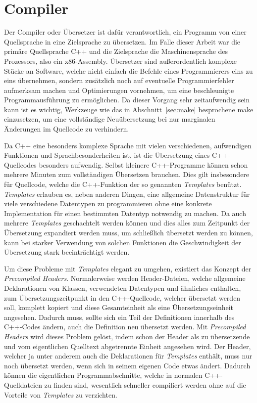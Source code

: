 \section{Compiler}
\label{sec:compiler}
Der Compiler oder Übersetzer ist dafür verantwortlich, ein Programm von einer Quellsprache in eine Zielsprache zu übersetzen. Im Falle dieser Arbeit war die primäre Quellsprache C++ und die
Zielsprache die Maschinensprache des Prozessors, also ein x86-Assembly. Übersetzer sind außerordentlich komplexe Stücke an Software, welche nicht einfach die Befehle eines Programmierers eins zu
eins übernehmen, sondern zusätzlich noch auf eventuelle Programmierfehler aufmerksam machen und Optimierungen vornehmen, um eine beschleunigte Programmausführung zu ermöglichen. Da dieser Vorgang sehr zeitaufwendig sein kann ist es wichtig, Werkzeuge wie
das in Abschnitt~\ref{sec:make} besprochene make einzusetzen, um eine vollständige Neuübersetzung bei nur marginalen Änderungen im Quellcode zu verhindern. 

Da C++ eine besonders komplexe Sprache mit vielen verschiedenen, aufwendigen Funktionen und Sprachbesonderheiten ist, ist die Übersetzung eines C++-Quellcodes besonders aufwendig. Selbst kleinere
C++-Programme können schon mehrere Minuten zum vollständigen Übersetzen brauchen. Dies gilt insbesondere für Quellcode, welche die C++-Funktion der so genannten \textit{Templates} benützt. \textit{Templates}
erlauben es, neben anderen Dingen, eine allgemeine Datenstruktur für viele verschiedene Datentypen zu programmieren ohne eine konkrete Implementation für einen bestimmten Datentyp notwendig zu machen.
Da auch mehrere \textit{Templates} geschachtelt werden können und dies alles zum Zeitpunkt der Übersetzung expandiert werden muss, um schließlich übersetzt werden zu können, kann bei starker Verwendung
von solchen Funktionen die Geschwindigkeit der Übersetzung stark beeinträchtigt werden.

Um diese Probleme mit \textit{Templates} elegant zu umgehen, existiert das Konzept der \textit{Precompiled Headers}. Normalerweise werden Header-Dateien, welche allgemeine Deklarationen von Klassen, verwendeten Datentypen
und ähnliches enthalten, zum Übersetzungszeitpunkt in den C++-Quellcode, welcher übersetzt werden soll, komplett kopiert und diese Gesamteinheit als eine Über\-setzungs\-einheit angesehen. Dadurch muss, sollte
sich ein Teil der Definitionen innerhalb des C++-Codes ändern, auch die Definition neu übersetzt werden. Mit \textit{Precompiled Headers} wird dieses Problem gelöst, indem schon der Header als zu übersetzende und vom eigentlichen Quelltext abgetrennte Einheit angesehen wird. Der Header, welcher ja unter anderem auch die Deklarationen für \textit{Templates} enthält, muss nur noch
übersetzt werden, wenn sich in seinem eigenen Code etwas ändert. Dadurch können die eigentlichen Programmabschnitte, welche in normalen C++-Quelldateien zu finden sind, wesentlich schneller
compiliert werden ohne auf die Vorteile von \textit{Templates} zu verzichten.


